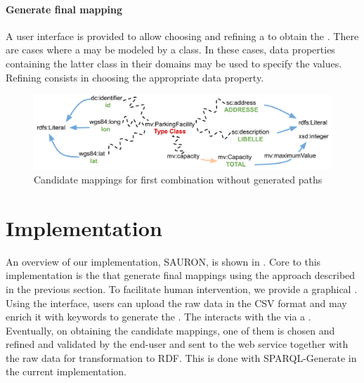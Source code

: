 \paragraph{Generate final mapping}
A user interface is provided to allow choosing and refining a  to obtain the . There are cases where a  may be modeled by a class. In these cases, data properties containing the latter class in their domains may be used to specify the values. Refining consists in choosing the appropriate data property.








\begin{figure}
	\centering
	\includegraphics[scale=0.4]{images/combinationNoPath.pdf}
	\caption{Candidate mappings for first combination without generated paths}
	\label{fig:combinationNoPath}
\end{figure}

\section{Implementation}\label{sec:implementation}
An overview of our implementation, SAURON, is shown in . Core to this implementation is the  that generate final mappings using the approach described in the previous section. To facilitate human intervention,
we provide a graphical . Using the interface, users can upload the raw data in the CSV format and may enrich it with keywords to generate the . The  interacts with the  via a . Eventually, on obtaining the candidate mappings, one of them is chosen and refined and validated by the end-user and sent to the web service together with the raw data for transformation to RDF. This is done with SPARQL-Generate in the current implementation.

